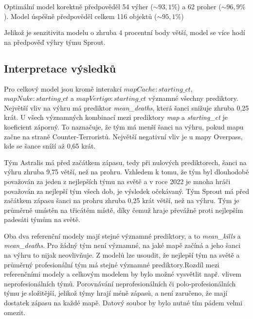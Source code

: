 

Optimální model korektně předpověděl 54 výher ($\sim 93,1\%$) a 62 proher ($\sim 96,9\%$). Model úspěšně předpověděl celkem 116 objektů ($\sim 95,1\%$)



Jelikož je senzitivita modelu o zhruba 4 procentní body větší, model se více hodí na předpověď výhry týmu Sprout.

\subsection{Interpretace výsledků}
Pro celkový model jsou kromě interakcí $mapCache:starting\_ct$, $mapNuke:starting\_ct$ a $mapVertigo:starting\_ct$ významné všechny prediktory. Největší vliv na výhru má
prediktor \textit{mean\_deaths}, která šanci snižuje zhruba 0,25 krát. U všech významných kombinací mezi prediktory \textit{map} a \textit{starting\_ct} je koeficient
záporný. To naznačuje, že tým má menší šanci na výhru, pokud mapu začne na straně Counter-Terroristů. Největší negativní vliv je u mapy Overpass, kde se šance
sníží až 0,65 krát.

Tým Astralis má před začátkem zápasu, tedy při nulových prediktorech, šanci na výhru zhruba 9,75 větší, než na prohru. Vzhledem k tomu, že tým byl dlouhodobě považován
za jeden z nejlepších týmu na světě a v roce 2022 je mnoha hráči považován za nejlepší tým všech dob, je výsledek očekávaný. Tým Sprout má před začátkem zápasu 
šanci na prohru zhruba 0,25 krát větší, než na výhru. Tým je průměrně umístěn na třicátém místě, díky čemuž hraje převážně proti nejlepším padesáti týmům na světě.

Oba dva referenční modely mají stejné významné prediktory, a to \textit{mean\_kills} a \textit{mean\_deaths}. Pro žádný tým není významné, na jaké mapě začíná a jeho šanci
na výhru to nijak neovlivňuje. Z modelů lze usoudit, že nejlepší tým na světě a průměrný profesionální tým má stejné významné prediktory.Rozdíl mezi referenčními modely a 
celkovým modelem by bylo možné vysvětlit např. vlivem neprofesionálních týmů. Porovnávání neprofesionálních či polo-profesionálních týmu je složitější, jelikož týmy 
hrají méně zápasů, a není zaručeno, že mají dostatek zápasu na každé mapě. Datový soubor by bylo nutné tím pádem velmi omezit.